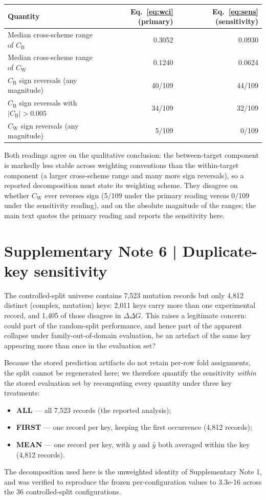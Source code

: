 \documentclass[11pt,a4paper]{article}
\begin{document}
\begin{center}
\begin{tabular}{@{}lrr@{}}
\toprule
Quantity & Eq.~\eqref{eq:wci} (primary) & Eq.~\eqref{eq:sens} (sensitivity) \\
\midrule
Median cross-scheme range of $C_{\mathrm{B}}$ & 0.3052 & 0.0930 \\
Median cross-scheme range of $C_{\mathrm{W}}$ & 0.1240 & 0.0624 \\
$C_{\mathrm{B}}$ sign reversals (any magnitude) & 40/109 & 44/109 \\
$C_{\mathrm{B}}$ sign reversals with $|C_{\mathrm{B}}|>0.005$ & 34/109 & 32/109 \\
$C_{\mathrm{W}}$ sign reversals (any magnitude) & 5/109 & 0/109 \\
\bottomrule
\end{tabular}
\end{center}

Both readings agree on the qualitative conclusion: the between-target component is markedly
less stable across weighting conventions than the within-target component (a larger
cross-scheme range and many more sign reversals), so a reported decomposition must state its
weighting scheme. They disagree on whether $C_{\mathrm{W}}$ ever reverses sign
(5/109 under the primary reading versus 0/109 under the sensitivity reading),
and on the absolute magnitude of the ranges; the main text quotes the primary reading and
reports the sensitivity here.

\section*{Supplementary Note 6 | Duplicate-key sensitivity}
The controlled-split universe contains 7{,}523 mutation records but only 4{,}812 distinct
(complex, mutation) keys: 2{,}011 keys carry more than one experimental record, and 1{,}405 of
those disagree in $\Delta\Delta G$. This raises a legitimate concern: could part of the
random-split performance, and hence part of the apparent collapse under family-out-of-domain
evaluation, be an artefact of the same key appearing more than once in the evaluation set?

Because the stored prediction artifacts do not retain per-row fold assignments, the split
cannot be regenerated here; we therefore quantify the sensitivity \emph{within} the stored
evaluation set by recomputing every quantity under three key treatments:
\begin{itemize}
  \item \textbf{ALL} --- all 7{,}523 records (the reported analysis);
  \item \textbf{FIRST} --- one record per key, keeping the first occurrence (4{,}812 records);
  \item \textbf{MEAN} --- one record per key, with $y$ and $\hat{y}$ both averaged within the
        key (4{,}812 records).
\end{itemize}
The decomposition used here is the unweighted identity of Supplementary Note 1, and was
verified to reproduce the frozen per-configuration values to 3.3e-16 across the 36
controlled-split configurations.
\end{document}
